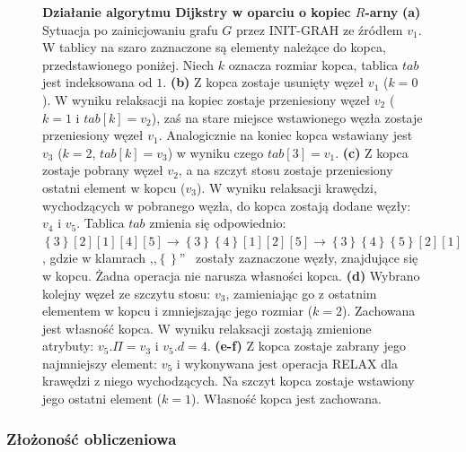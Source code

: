 \begin{figure}[!htbp]
\begin{subfigure}[b]{0.33\textwidth}
		\caption{}
	\end{subfigure}
	\caption{\textbf{Działanie algorytmu Dijkstry w oparciu o kopiec $R$-arny} \textbf{(a)} Sytuacja po zainicjowaniu grafu $G$ przez \textsf{INIT-GRAH} ze źródłem $v_{1}$. W tablicy na szaro zaznaczone są elementy należące do kopca, przedstawionego poniżej. Niech $k$ oznacza rozmiar kopca, tablica $tab$ jest indeksowana od $1$. \textbf{(b)} Z kopca zostaje usunięty węzeł $v_{1}$ ($k=0$). W wyniku relaksacji na kopiec zostaje przeniesiony węzeł $v_{2}$ ($k=1$ i $tab \left[ k \right] = v_{2}$), zaś na stare miejsce wstawionego węzła zostaje przeniesiony węzeł $v_{1}$. Analogicznie na koniec kopca wstawiany jest $v_{3}$  ($k=2$, $tab \left[ k \right] = v_{3}$) w wyniku czego $tab \left[ 3 \right] = v_{1}$. \textbf{(c)} Z kopca zostaje pobrany węzeł $v_{2}$, a na szczyt stosu zostaje przeniesiony ostatni element w kopcu ($v_{3}$). W wyniku relaksacji krawędzi, wychodzących w pobranego węzła, do kopca zostają dodane węzły: $v_{4}$ i $v_{5}$. Tablica $tab$ zmienia się odpowiednio: $\left\{ 3 \right\} \left[ 2 \right]  \left[ 1 \right]  \left[ 4 \right]  \left[ 5 \right] \rightarrow \left\{ 3 \right\} \left\{ 4 \right\}  \left[ 1 \right]  \left[ 2 \right]  \left[ 5 \right] \rightarrow \left\{ 3 \right\} \left\{ 4 \right\}  \left\{ 5 \right\}  \left[ 2 \right]  \left[ 1 \right]$, gdzie w klamrach ,,$\left\{\right\}$''~ zostały zaznaczone węzły, znajdujące się w kopcu. Żadna operacja nie narusza własności kopca. \textbf{(d)} Wybrano kolejny węzeł ze szczytu stosu: $v_{3}$, zamieniając go z ostatnim elementem w kopcu i zmniejszając jego rozmiar ($k=2$). Zachowana jest własność kopca. W wyniku relaksacji zostają zmienione atrybuty: $v_{5}.\Pi = v_{3}$ i $v_{5}.d = 4$. \textbf{(e-f)} Z kopca zostaje zabrany jego najmniejszy element: $v_{5}$ i wykonywana jest operacja \textsf{RELAX} dla krawędzi z niego wychodzących. Na szczyt kopca zostaje wstawiony jego ostatni element ($k=1$). Własność kopca jest zachowana.} \label{fig:exampleDHeap}
\end{figure}

\subsubsection{Złożoność obliczeniowa}

